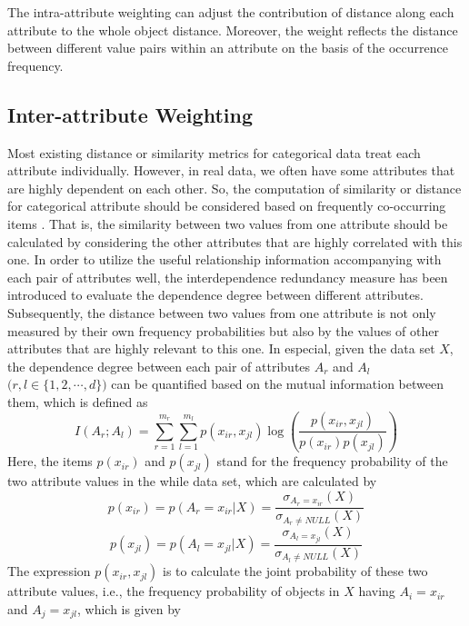 \documentclass[review]{elsarticle}
\begin{document}
The intra-attribute weighting can adjust the contribution of distance along each attribute to the whole object distance. Moreover, the weight reflects the distance between different value pairs within an attribute on the basis of the occurrence frequency.

\subsection{Inter-attribute Weighting}
Most existing distance or similarity metrics for categorical data treat each attribute individually. However, in real data, we often have some attributes that are highly dependent on each other. So, the computation of similarity or distance for categorical attribute should be considered based on frequently co-occurring items \cite{VGanti1999CACTUS}. That is, the similarity between two values from one attribute should be calculated by considering the other attributes that are highly correlated with this one. In order to utilize the useful relationship information accompanying with each pair of attributes well, the interdependence redundancy measure \cite{WaiHoAu2005Grouping} has been introduced to evaluate the dependence degree between different attributes. Subsequently, the distance between two values from one attribute is not only measured by their own frequency probabilities but also by the values of other attributes that are highly relevant to this one. In especial, given the data set $X$, the dependence degree between each pair of attributes $A_r$ and $A_l$ $\mathbf (r,l \in \{1,2,\cdots,d\})$ can be quantified based on the mutual information \cite{MacKay2003InformationTheory} between them, which is defined as
\begin{equation}
I(A_r;A_l) = \sum_{r=1}^{m_r}\sum_{l=1}^{m_l}p(x_{ir},x_{jl})\log(\frac{p(x_{ir},x_{jl})}{p(x_{ir})p(x_{jl})})
\label{equ10}
\end{equation}
Here, the items $p(x_{ir})$ and $p(x_{jl})$ stand for the frequency probability of the two attribute values in the while data set, which are calculated by
\begin{equation}
p(x_{ir}) = p(A_r = x_{ir}|X) = \frac{\sigma_{A_r = x_{ir}}(X)}{\sigma_{A_r \neq NULL}(X)}
\label{equ11}
\end{equation}
\begin{equation}
p(x_{jl}) = p(A_l = x_{jl}|X) = \frac{\sigma_{A_l = x_{jl}}(X)}{\sigma_{A_l \neq NULL}(X)}
\label{equ12}
\end{equation}
The expression $p(x_{ir},x_{jl})$ is to calculate the joint probability of these two attribute values, i.e., the frequency probability of objects in $X$ having $A_i = x_{ir}$ and $A_j = x_{jl}$, which is given by
\end{document}
